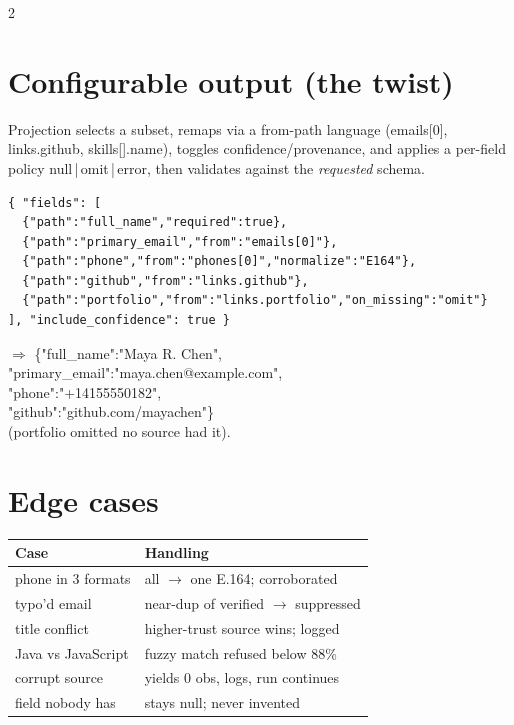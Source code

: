 \documentclass[10pt]{article}
\newcommand{\fld}[1]{{\ttfamily\footnotesize #1}}
\begin{document}
\begin{multicols}{2}
\columnbreak

\section{Configurable output (the twist)}
Projection selects a subset, remaps via a \fld{from}-path language
(\fld{emails[0]}, \fld{links.github}, \fld{skills[].name}), toggles
confidence/provenance, and applies a per-field policy
\fld{null\,|\,omit\,|\,error}, then validates against the
\emph{requested} schema.

\begin{lstlisting}[style=cfg]
{ "fields": [
  {"path":"full_name","required":true},
  {"path":"primary_email","from":"emails[0]"},
  {"path":"phone","from":"phones[0]","normalize":"E164"},
  {"path":"github","from":"links.github"},
  {"path":"portfolio","from":"links.portfolio","on_missing":"omit"}
], "include_confidence": true }
\end{lstlisting}
\vspace{-2pt}
$\Rightarrow$ \fld{\{"full\_name":"Maya R. Chen",}\\
\fld{\phantom{$\Rightarrow$ }"primary\_email":"maya.chen@example.com",}\\
\fld{\phantom{$\Rightarrow$ }"phone":"+14155550182",}\\
\fld{\phantom{$\Rightarrow$ }"github":"github.com/mayachen"\}}\\
({\footnotesize\fld{portfolio} omitted \textemdash{} no source had it}).

\section{Edge cases}
\vspace{-2pt}
{\renewcommand{\arraystretch}{1.05}\setlength{\tabcolsep}{3pt}
\begin{tabular}{@{}p{1.95cm}p{4.1cm}@{}}
\toprule
\textbf{Case} & \textbf{Handling} \\
\midrule
phone in 3 formats & all $\to$ one E.164; corroborated \\
typo'd email & near-dup of verified $\to$ suppressed \\
title conflict & higher-trust source wins; logged \\
\fld{Java} vs \fld{JavaScript} & fuzzy match refused below 88\% \\
corrupt source & yields 0 obs, logs, run continues \\
field nobody has & stays \fld{null}; never invented \\
\bottomrule
\end{tabular}}


\end{multicols}
\end{document}
